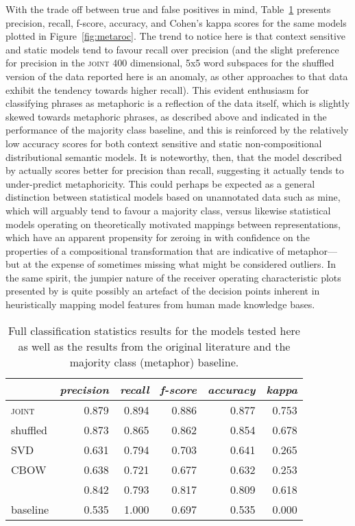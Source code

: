 With the trade off between true and false positives in mind, Table~\ref{tab:metastats} presents precision, recall, f-score, accuracy, and Cohen's kappa scores for the same models plotted in Figure~\ref{fig:metaroc}.  The trend to notice here is that context sensitive and static models tend to favour recall over precision (and the slight preference for precision in the \textsc{joint} 400 dimensional, 5x5 word subspaces for the shuffled version of the data reported here is an anomaly, as other approaches to that data exhibit the tendency towards higher recall).  This evident enthusiasm for classifying phrases as metaphoric is a reflection of the data itself, which is slightly skewed towards metaphoric phrases, as described above and indicated in the performance of the majority class baseline, and this is reinforced by the relatively low accuracy scores for both context sensitive and static non-compositional distributional semantic models.  It is noteworthy, then, that the model described by \cite{GutierrezEA2016} actually scores better for precision than recall, suggesting it actually tends to under-predict metaphoricity.  This could perhaps be expected as a general distinction between statistical models based on unannotated data such as mine, which will arguably tend to favour a majority class, versus likewise statistical models operating on theoretically motivated mappings between representations, which have an apparent propensity for zeroing in with confidence on the properties of a compositional transformation that are indicative of metaphor---but at the expense of sometimes missing what might be considered outliers.  In the same spirit, the jumpier nature of the receiver operating characteristic plots presented by \cite{TsvetkovEA2014} is quite possibly an artefact of the decision points inherent in heuristically mapping model features from human made knowledge bases.

\begin{table}
\centering
\begin{tabular}{lrrrrr}
\hline
\ & \emph{precision} & \emph{recall} & \emph{f-score} & \emph{accuracy} & \emph{kappa} \\
\hline
\textsc{joint} & 0.879 & 0.894 & 0.886 & 0.877 & 0.753\\
shuffled & 0.873 & 0.865 & 0.862 & 0.854 & 0.678 \\
\textsc{SVD} & 0.631 & 0.794 & 0.703 & 0.641 & 0.265 \\
\textsc{CBOW} & 0.638 & 0.721 & 0.677 & 0.632 & 0.253 \\
\cite{GutierrezEA2016} & 0.842 & 0.793 & 0.817 & 0.809 & 0.618 \\
baseline & 0.535 & 1.000 & 0.697 & 0.535 & 0.000 \\
\hline
\end{tabular}
\caption[Comparative Metaphor Classification Statistics]{Full classification statistics results for the models tested here as well as the results from the original literature and the majority class (metaphor) baseline.}
\label{tab:metastats}
\end{table}

